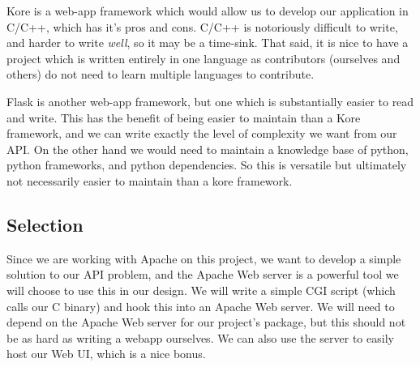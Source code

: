 Kore is a web-app framework which would allow us to develop our application in C/C++, which has it's pros and cons.
C/C++ is notoriously difficult to write, and harder to write \textit{well}, so it may be a time-sink.
That said, it is nice to have a project which is written entirely in one language as contributors (ourselves and others) do not need to learn multiple languages to contribute.

Flask is another web-app framework, but one which is substantially easier to read and write.
This has the benefit of being easier to maintain than a Kore framework, and we can write exactly the level of complexity we want from our API.
On the other hand we would need to maintain a knowledge base of python, python frameworks, and python dependencies.
So this is versatile but ultimately not necessarily easier to maintain than a kore framework.

\subsection{Selection}

Since we are working with Apache on this project, we want to develop a simple solution to our API problem, and the Apache Web server is a powerful tool we will choose to use this in our design.
We will write a simple CGI script (which calls our C binary) and hook this into an Apache Web server.
We will need to depend on the Apache Web server for our project's package, but this should not be as hard as writing a webapp ourselves.
We can also use the server to easily host our Web UI, which is a nice bonus.
